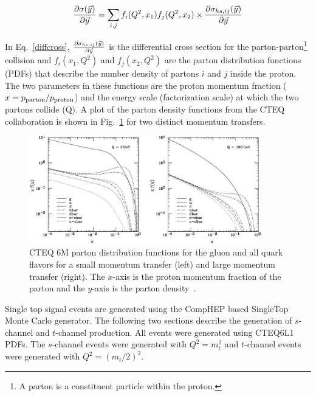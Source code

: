 \begin{equation}
\label{diffcross}
\frac{\partial \sigma(\vec{y})}{\partial \vec{y}} = \sum_{i,j} f_{i}(Q^{2},x_{1})f_{j}(Q^{2},x_{2}) \times \frac{\partial \sigma_{hs,ij}(\vec{y})}{\partial \vec{y}}
\end{equation}

In Eq.~\ref{diffcross}, $\frac{\partial \sigma_{hs,ij}(\vec{y})}{\partial \vec{y}}$ is the differential cross section for the parton-parton\footnote{A parton is a constituent particle within the proton.} collision and $f_{i}(x_{1},Q^{2})$ and $f_{j}(x_{2},Q^{2})$ are the parton distribution functions (PDFs) that describe the number density of partons $i$ and $j$ inside the proton. The two parameters in these functions are the proton momentum fraction ($x=p_{\rm{parton}}/p_{\rm{proton}}$) and the energy scale (factorization scale) at which the two partons collide (Q). A plot of the parton density functions from the CTEQ~\cite{Pumplin:2002vw} collaboration is shown in Fig.~\ref{cteqpdfs} for two distinct momentum transfers. 

\begin{figure}[!h!tbp]
\begin{center}
\includegraphics[width=0.90\textwidth]{eps/Theory/CTEQ_pdfs.eps}
\end{center}
\vspace{-0.1in}
\caption{CTEQ 6M parton distribution functions for the gluon and all quark flavors for a small momentum transfer (left) and large momentum transfer (right). The $x$-axis is the proton momentum fraction of the parton and the $y$-axis is the parton density~\cite{Pumplin:2002vw}.}
\label{cteqpdfs}
\end{figure}


Single top signal events are generated using the CompHEP based SingleTop~\cite{Boos:SingleTop} Monte Carlo generator. The following two sections describe the generation of $s$-channel and $t$-channel production. All events were generated using CTEQ6L1 PDFs. The $s$-channel events were generated with $Q^{2}=m_{t}^{2}$ and $t$-channel events were generated with $Q^{2}=(m_{t}/2)^{2}$.

